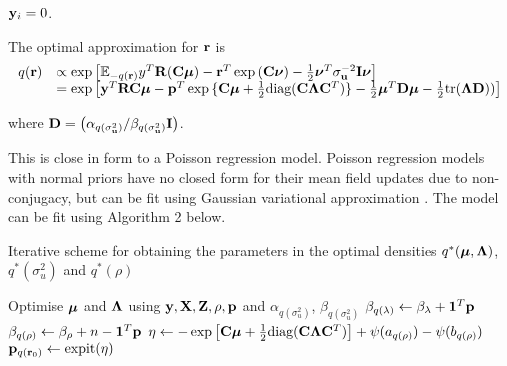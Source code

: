 \documentclass{article}[12pt]
\begin{document}
\noindent {} ${\bf y}_i = 0$.



\noindent The optimal approximation for ${\bf r}$ is
$$
\begin{array}{rl}
q({\bf r}) &\propto \exp \left [ {\mathbb E}_{-q({\bf r})}y^T{\bf R}({\bf C}{\boldsymbol \mu}) - {\bf r}^T\exp{({\bf C}{\boldsymbol\nu})}-{\frac{1}{2}} {\boldsymbol \nu}^T \sigma_{{\bf u}}^{-2} {\bf I} {\boldsymbol \nu} \right ] \\
&= \exp{\left [{\bf y}^T{\bf R}{\bf C}{\boldsymbol\mu}- {\bf p}^T \exp{\{{\bf C}{\boldsymbol\mu}+ {\frac{1}{2}}\text{diag}({\bf C}{\boldsymbol\Lambda}{\bf C}^T)\}} - {\frac{1}{2}}{\boldsymbol\mu}^T {\bf D}{\boldsymbol\mu}- {\frac{1}{2}}\text{tr}({\boldsymbol\Lambda}{\bf D})) \right ]}
\end{array}
$$

\noindent where ${\bf D} = \left (\alpha_{q(\sigma_{{\bf u}}^2)}/\beta_{q(\sigma_{{\bf u}}^2)} {\bf I} \right )$. 

\noindent This is close in form to a Poisson regression model. Poisson regression models
with normal priors have no closed form for their mean field updates due to
non-conjugacy, but can be fit using Gaussian variational approximation
\citep{ormerod09}. The model can be fit using Algorithm 2 below.

\begin{algorithm}\label{alg:algorithm_two}
\label{algorithm2}
\caption[Algorithm 2]{Iterative scheme for obtaining the parameters in the
optimal densities $q^*({\boldsymbol \mu}, {\boldsymbol \Lambda})$, $q^*(\sigma_u^2)$ and $q^*(\rho)$}
\begin{algorithmic}
\STATE Optimise ${\boldsymbol \mu}$ and ${\boldsymbol \Lambda}$ using ${\bf y}, {\bf X}, {\bf Z}, \rho, {\bf p}$ and
$\alpha_{q(\sigma_u^2)}$, $\beta_{q(\sigma_u^2)}$
\STATE $\beta_{q(\lambda)} \leftarrow \beta_\lambda + {\bf 1}^T{\bf p}$
\STATE $\beta_{q(\rho)} \leftarrow \beta_\rho + n - {\bf 1}^T{\bf p}$
\STATE $\eta \leftarrow -\exp \left [ {\bf C} {\boldsymbol \mu} + {\frac{1}{2}} \text{diag}{({\bf C}{\boldsymbol\Lambda}{\bf C}^T)} \right ] + \psi{(a_{q{(\rho)}})} - \psi{(b_{q{(\rho)}})}$
\STATE ${\bf p}_{q({\bf r}_0)} \leftarrow \text{expit} (\eta)$
\ENDWHILE
\end{algorithmic}
\end{algorithm}
\end{document}
